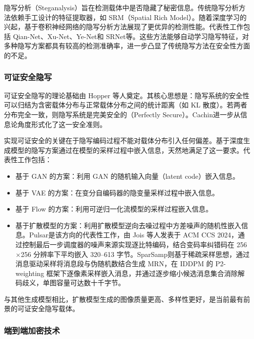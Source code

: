 隐写分析（Steganalysis）旨在检测载体中是否隐藏了秘密信息。传统隐写分析方法依赖手工设计的特征提取器，如 SRM（Spatial Rich Model）\supercite{fridrich2012rich}。随着深度学习的兴起，基于卷积神经网络的隐写分析方法展现了更优异的检测性能。代表性工作包括 Qian-Net\supercite{qian2015deep}、Xu-Net\supercite{xu2016structural}、Ye-Net\supercite{ye2017deep}和 SRNet\supercite{boroumand2019deep}等。这些方法能够自动学习隐写特征，对多种隐写方案都具有较高的检测准确率，进一步凸显了传统隐写方法在安全性方面的不足。

\subsubsection{可证安全隐写}

可证安全隐写的理论基础由 Hopper 等人\supercite{hopper2009provably}奠定。其核心思想是：隐写系统的安全性可以归结为含密载体分布与正常载体分布之间的统计距离（如 KL 散度）。若两者分布完全一致，则隐写系统是完美安全的（Perfectly Secure）。Cachin\supercite{cachin2004information}进一步从信息论角度形式化了这一安全准则。

实现可证安全的关键在于隐写编码过程不能对载体分布引入任何偏差。基于深度生成模型的隐写方案通过在模型的采样过程中嵌入信息，天然地满足了这一要求。代表性工作包括：

\begin{itemize}
    \item 基于 GAN 的方案：利用 GAN 的随机输入向量（latent code）嵌入信息\supercite{hu2018novel}。
    \item 基于 VAE 的方案：在变分自编码器的隐变量采样过程中嵌入信息。
    \item 基于 Flow 的方案：利用可逆归一化流模型的采样过程嵌入信息\supercite{de2022perfectly}。
    \item 基于扩散模型的方案：利用扩散模型逆向去噪过程中方差噪声的随机性嵌入信息。Pulsar\supercite{jois2024pulsar}是该方向的代表性工作，由 Jois 等人发表于 ACM CCS 2024，通过控制最后一步调度器的噪声来源实现逐比特编码，结合变码率纠错码在 256$\times$256 分辨率下平均嵌入 320--613 字节。SparSamp\supercite{wang2025sparsamp}则基于稀疏采样思想，通过消息驱动采样将消息段与伪随机数结合生成 MRN，在 IDDPM 的 P2-weighting 框架下逐像素采样嵌入消息，并通过逐步缩小候选消息集合消除解码歧义，单图容量可达数十千字节。
\end{itemize}

与其他生成模型相比，扩散模型生成的图像质量更高、多样性更好，是当前最有前景的可证安全隐写载体。

\subsubsection{端到端加密技术}

